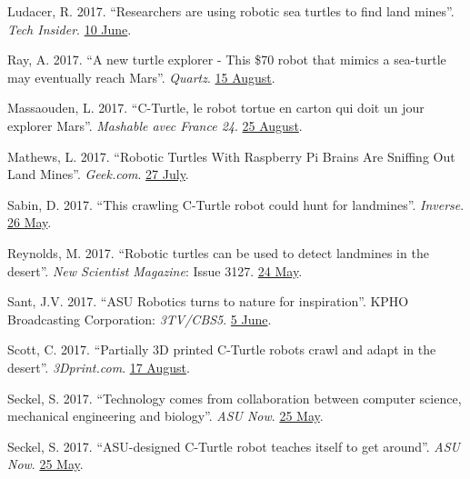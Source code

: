 \documentclass[12pt,a4paper]{article}
\begin{document}
\begin{description}
			\item Ludacer, R. 2017. ``Researchers are using robotic sea turtles to find land mines''. \textit{Tech Insider}. \href{https://www.facebook.com/techinsider/videos/787578874773804/}{10 June}.
			\item Ray, A. 2017. ``A new turtle explorer - This \$70 robot that mimics a sea-turtle may eventually reach Mars''. \textit{Quartz}. \href{https://qz.com/1053078/this-70-robot-that-mimics-a-sea-turtle-may-eventually-reach-mars/}{15 August}.
			\item Massaouden, L. 2017. ``C-Turtle, le robot tortue en carton qui doit un jour explorer Mars''. \textit{Mashable avec France 24}. \href{http://mashable.france24.com/videos/20170825-c-turtle-robot-tortue-carton-exploration-mars}{25 August}.
			\item Mathews, L. 2017. ``Robotic Turtles With Raspberry Pi Brains Are Sniffing Out Land Mines''. \textit{Geek.com}. \href{https://www.geek.com/tech/robotic-turtles-with-raspberry-pi-brains-are-sniffing-out-land-mines-1709339/}{27 July}.
			\item Sabin, D. 2017. ``This crawling C-Turtle robot could hunt for landmines''. \textit{Inverse}. \href{https://www.inverse.com/article/32219-cturtle-robot-sea-turtle-mines}{26 May}.
			\item Reynolds, M. 2017. ``Robotic turtles can be used to detect landmines in the desert''. \textit{New Scientist Magazine}: Issue 3127. \href{https://www.newscientist.com/article/mg23431274-200-robotic-turtles-can-be-used-to-detect-landmines-in-the-desert/}{24 May}.
			\item Sant, J.V. 2017. ``ASU Robotics turns to nature for inspiration''. KPHO Broadcasting Corporation: \textit{3TV/CBS5}. \href{http://www.azfamily.com/story/35595946/asu-robotics-turns-to-nature-for-inspiration}{5 June}.
			\item Scott, C. 2017. ``Partially 3D printed C-Turtle robots crawl and adapt in the desert''. \textit{3Dprint.com}. \href{https://3dprint.com/184523/3d-printed-c-turtle-robots/}{17 August}.
			\item Seckel, S. 2017. ``Technology comes from collaboration between computer science, mechanical engineering and biology''. \textit{ASU Now}. \href{https://asunow.asu.edu/20170525-solutions-asu-designed-c-turtle-robot-teaches-itself-get-around}{25 May}.
			\item Seckel, S. 2017. ``ASU-designed C-Turtle robot teaches itself to get around''. \textit{ASU Now}. \href{https://asunow.asu.edu/20170525-solutions-asu-designed-c-turtle-robot-teaches-itself-get-around}{25 May}.

\end{description}
\end{document}
